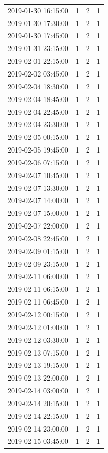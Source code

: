\begin{tabular}{lrrr}
2019-01-30 16:15:00 & 1 & 2 & 1 \\
2019-01-30 17:30:00 & 1 & 2 & 1 \\
2019-01-30 17:45:00 & 1 & 2 & 1 \\
2019-01-31 23:15:00 & 1 & 2 & 1 \\
2019-02-01 22:15:00 & 1 & 2 & 1 \\
2019-02-02 03:45:00 & 1 & 2 & 1 \\
2019-02-04 18:30:00 & 1 & 2 & 1 \\
2019-02-04 18:45:00 & 1 & 2 & 1 \\
2019-02-04 22:45:00 & 1 & 2 & 1 \\
2019-02-04 23:30:00 & 1 & 2 & 1 \\
2019-02-05 00:15:00 & 1 & 2 & 1 \\
2019-02-05 19:45:00 & 1 & 2 & 1 \\
2019-02-06 07:15:00 & 1 & 2 & 1 \\
2019-02-07 10:45:00 & 1 & 2 & 1 \\
2019-02-07 13:30:00 & 1 & 2 & 1 \\
2019-02-07 14:00:00 & 1 & 2 & 1 \\
2019-02-07 15:00:00 & 1 & 2 & 1 \\
2019-02-07 22:00:00 & 1 & 2 & 1 \\
2019-02-08 22:45:00 & 1 & 2 & 1 \\
2019-02-09 01:15:00 & 1 & 2 & 1 \\
2019-02-09 23:15:00 & 1 & 2 & 1 \\
2019-02-11 06:00:00 & 1 & 2 & 1 \\
2019-02-11 06:15:00 & 1 & 2 & 1 \\
2019-02-11 06:45:00 & 1 & 2 & 1 \\
2019-02-12 00:15:00 & 1 & 2 & 1 \\
2019-02-12 01:00:00 & 1 & 2 & 1 \\
2019-02-12 03:30:00 & 1 & 2 & 1 \\
2019-02-13 07:15:00 & 1 & 2 & 1 \\
2019-02-13 19:15:00 & 1 & 2 & 1 \\
2019-02-13 22:00:00 & 1 & 2 & 1 \\
2019-02-14 03:00:00 & 1 & 2 & 1 \\
2019-02-14 20:15:00 & 1 & 2 & 1 \\
2019-02-14 22:15:00 & 1 & 2 & 1 \\
2019-02-14 23:00:00 & 1 & 2 & 1 \\
2019-02-15 03:45:00 & 1 & 2 & 1 \\

\end{tabular}
